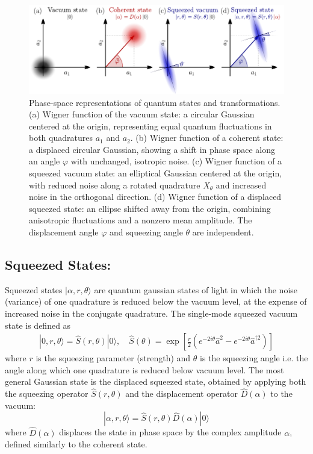 \begin{figure}
\centering
\includegraphics[width=\textwidth]{./chap2/fig/quantum_states.pdf}
\caption{Phase-space representations of quantum states and transformations.
(a) Wigner function of the vacuum state: a circular Gaussian centered at the origin, representing equal quantum fluctuations in both quadratures $a_1$ and $a_2$.
(b) Wigner function of a coherent state: a displaced circular Gaussian, showing a shift in phase space along an angle $\varphi$ with unchanged, isotropic noise.
(c) Wigner function of a squeezed vacuum state: an elliptical Gaussian centered at the origin, with reduced noise along a rotated quadrature $X_\theta$ and increased noise in the orthogonal direction.
(d) Wigner function of a displaced squeezed state: an ellipse shifted away from the origin, combining anisotropic fluctuations and a nonzero mean amplitude. The displacement angle $\varphi$ and squeezing angle $\theta$ are independent.} 
\end{figure}


\subsection*{Squeezed States:}

Squeezed states $|\alpha, r, \theta\rangle $ are quantum gaussian states of light in which the noise (variance) of one quadrature is reduced below the vacuum level, at the expense of increased noise in the conjugate quadrature. The single-mode squeezed vacuum state is defined as
\begin{align}
|0, r, \theta \rangle = \hat{S}(r, \theta) |0\rangle , \quad \hat{S}(\theta) = \exp\left[\frac{r}{2}(e^{-2 i\theta} \hat{a}^2 - e^{-2 i\theta} \hat{a}^{\dagger 2})\right]
\end{align}
where $r$ is the squeezing parameter (strength) and $\theta$ is the squeezing angle i.e. the angle along which one quadrature is reduced below vacuum level. The most general Gaussian state is the displaced squeezed state, obtained by applying both the squeezing operator $\hat{S}(r, \theta)$ and the displacement operator $\hat{D}(\alpha)$ to the vacuum:
\begin{equation}
|\alpha, r, \theta\rangle = \hat{S}(r, \theta)\hat{D}(\alpha)|0\rangle
\end{equation}
where $\hat{D}(\alpha)$ displaces the state in phase space by the complex amplitude $\alpha$, defined similarly to the coherent state. \\

